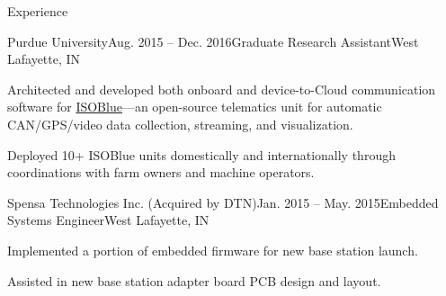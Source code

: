 \documentclass{resume}
\begin{document}
\begin{rSection}{Experience}
    \begin{rSubsection}{Purdue University}{Aug. 2015 -- Dec. 2016}{Graduate
        Research Assistant}{West Lafayette, IN}
      \item Architected and developed both onboard and device-to-Cloud
        communication software for \href{https://www.isoblue.org/}{ISOBlue}---an
        open-source telematics unit for automatic CAN/GPS/video data collection,
        streaming, and visualization.
      \item Deployed 10+ ISOBlue units domestically and internationally through
        coordinations with farm owners and machine operators.
    \end{rSubsection}

    \begin{rSubsection}{Spensa Technologies Inc. (Acquired by DTN)}{Jan. 2015 --
      May. 2015}{Embedded Systems Engineer}{West Lafayette, IN}
      \item Implemented a portion of embedded firmware for new base station
        launch.
      \item Assisted in new base station adapter board PCB design and layout. 
    \end{rSubsection}

%
  \end{rSection}
  
\end{document}
